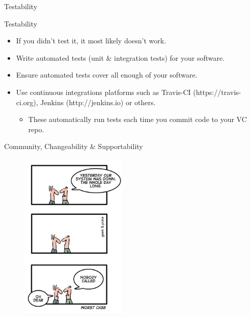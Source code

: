 \documentclass[compress]{beamer}
\begin{document}
\begin{frame}{Testability}
    \begin{block}{Testability}
        \begin{itemize}
        \item If you didn't test it, it most likely doesn't work.
        \item Write automated tests (unit \& integration tests) for your software.
        \item Ensure automated tests cover all enough of your software.
        \item Use continuous integrations platforms such as Travis-CI (https://travis-ci.org), Jenkins (http://jenkins.io) or others.
            \begin{itemize}
                \item These automatically run tests each time you commit code to your VC repo.
            \end{itemize}
        \end{itemize}
    \end{block}
\end{frame}

\begin{frame}{Community, Changeability \& Supportability}
\begin{figure}
\includegraphics[height=8cm]{img/community.jpg}
\end{figure}
\end{frame}
\end{document}
